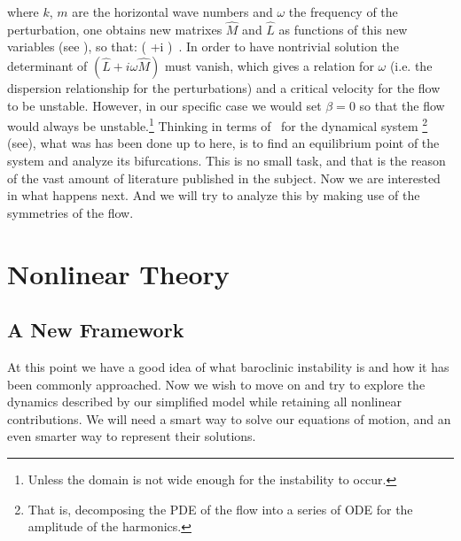 where $k$, $m$ are the horizontal wave numbers and $\omega$ the frequency
of the perturbation, one obtains new matrixes $\hat{M}$ and $\hat{L}$ as
functions of this new variables (see ), so that:
\beq
\left( +i \omega {}\right) 
\,.
In order to have nontrivial solution the determinant of $\left( \hat{L}+i
\omega \hat{M}\right)$ must vanish, which gives a relation
for $\omega$ (i.e. the dispersion relationship for the
perturbations) and a critical velocity for the flow to be unstable.
However, in our specific case we would set $\beta =0$ so that the flow would always
be unstable.\footnote{Unless the domain is not wide enough for the instability to occur.}
Thinking in terms of \statesp\ for the dynamical system
\footnote{
    That is, decomposing the PDE of the flow into
    a series of ODE for the amplitude of the harmonics.
}
(see), what was has been done up to here, is to find an equilibrium point of
the system and analyze its bifurcations. This is no small task, and that
is the reason of the vast amount of literature published in the subject.
Now we are interested in what happens next. And we will try to analyze
this by making use of the symmetries of the flow.

\section{Nonlinear Theory}
\label{s:nonlinear}
\subsection{A New Framework}
At this point we have a good idea of what baroclinic instability is and how it has been commonly approached. Now we wish to move on and try to explore the dynamics described by our simplified model while retaining all nonlinear contributions.
We will need a smart way to solve our equations of motion, and an even smarter way to represent their solutions.


